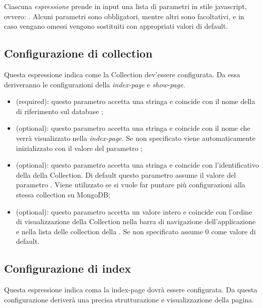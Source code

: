 Ciascuna \textit{espressione} prende in input una lista di parametri in stile javascript, ovvero: . Alcuni parametri sono obbligatori, mentre altri sono facoltativi, e in caso vengano omessi vengono sostituiti con appropriati valori di default.

\subsection{Configurazione di collection}

Questa espressione indica come la Collection dev'essere configurata. Da essa deriveranno le configurazioni della \textit{index-page} e \textit{show-page}.

\begin{itemize}

	\item \textbf{} (required): questo parametro accetta una stringa e coincide con il nome della  di riferimento sul database ;
	\item \textbf{} (optional): questo parametro accetta una stringa e coincide con il nome che verrà visualizzato nella \textit{index-page}. Se non specificato viene automaticamente inizializzato con il valore del parametro ;
	\item \textbf{} (optional): questo parametro accetta una stringa e coincide con l'identificativo della  della Collection. Di default questo parametro assume il valore del parametro . Viene utilizzato se si vuole far puntare più configurazioni alla stessa collection su MongoDB;
	\item \textbf{} (optional): questo parametro accetta un valore intero e coincide con l'ordine di visualizzazione della Collection nella barra di navigazione dell'applicazione e nella lista delle collection della . Se non specificato assume 0 come valore di default.

\end{itemize}

\subsection{Configurazione di index}

Questa espressione indica coma la index-page dovrà essere configurata. Da questa configurazione deriverà una precisa strutturazione e visualizzazione della pagina.

